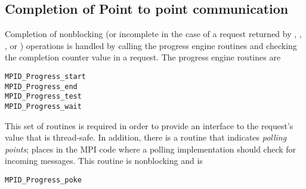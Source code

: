\subsection{Completion of Point to point communication}
Completion of nonblocking (or incomplete in the case of a request
returned by , , , or
) operations is handled by calling the progress engine routines
and checking the completion counter value in a request.  The progress engine
routines are
\begin{verbatim}
MPID_Progress_start
MPID_Progress_end
MPID_Progress_test
MPID_Progress_wait
\end{verbatim}
This set of routines is required in order to provide an
interface to the request's  value that is thread-safe.
In addition, there is a routine that indicates \emph{polling
  points}; 
places in the MPI code where a polling implementation should check for
incoming messages.  This routine is nonblocking and is 
\begin{verbatim}
MPID_Progress_poke
\end{verbatim}



